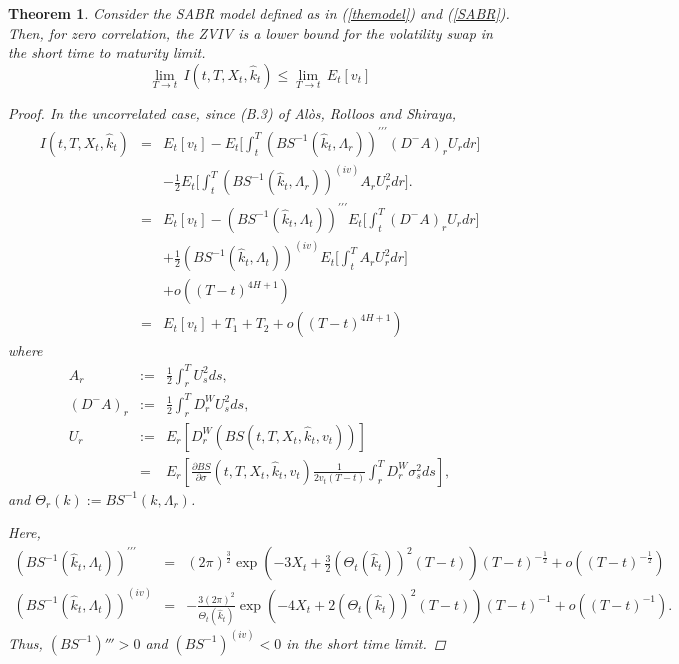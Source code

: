 \documentclass[11pt]{article}
\newtheorem{theorem}{Theorem}
\begin{document}
\begin{theorem}Consider the SABR model defined as in (\ref{themodel}) and (\ref{SABR}). Then, for zero correlation, the ZVIV is a lower bound for the volatility swap in the short time to maturity limit.
\begin{equation}
\lim_{T \to t} \, I( t,T,X_t,\hat{k}_t) \leq \lim_{T \to t} \,  E_{t}[v_{t}]
\end{equation}
\begin{proof}
In the uncorrelated case, since (B.3) of Al\`os, Rolloos and Shiraya,
\begin{eqnarray}
\label{primerpas}
I\left( t,T,X_t,\hat{k}_t\right) &=& E_{t}\left[ v_{t}\right] -  E_t\Bigg[\int_{t}^{T}\left( BS^{-1}\left( \hat{k}_t, \Lambda_r\right)\right) ^{\prime \prime\prime} (D^-A)_r U_r dr\Bigg]\nonumber\\
&&- \frac12 E_t\Bigg[
\int_{t}^{T}\left( BS^{-1}\left( \hat{k}_t, \Lambda_r\right)\right) ^{(iv)} A_r U_r^2 dr \Bigg].
\label{I-E[v]}\nonumber\\
&=& 
E_{t}\left[ v_{t}\right] -\left( BS^{-1}\left( \hat{k}_t, \Lambda_t\right)\right) ^{\prime \prime\prime} E_t\Bigg[\int_{t}^{T}(D^-A)_r U_r dr\Bigg]\nonumber\\
&&+ \frac12 \left( BS^{-1}\left( \hat{k}_t, \Lambda_t\right)\right) ^{(iv)} E_t\Bigg[
\int_{t}^{T} A_r U_r^2 dr \Bigg]\nonumber\\
&&+o((T-t)^{4H+1})\nonumber\\
&=& E_{t}\left[ v_{t}\right] + T_1 + T_2 +o((T-t)^{4H+1})
\end{eqnarray}
where 
\begin{eqnarray}
A_r&:=&\frac12 \int_{r}^{T} U_{s}^{2}ds,\\
(D^-A)_r&:=&\frac{1}{2}\int^T_r D_r^W U^2_s ds,\\
U_{r}&:=&E_{r}\left[D_r^W\left(BS(t,T,X_t,\hat{k}_t,v_t)\right)\right]\nonumber\\
&=&E_r\left[\frac{\partial BS}{\partial \sigma}(t,T,X_t,\hat{k}_t,v_t)\frac{1}{2v_t(T-t)}\int_r^T D_r^W\sigma_s^2 ds\right],
\end{eqnarray}
and $\Theta_{r}(k):=BS^{-1}(k,\Lambda_r)$.

Here,
\begin{eqnarray}
\label{terceraderivada}
\left( BS^{-1}\left( \hat{k}_t, \Lambda_t\right)\right) ^{\prime \prime\prime}
&=&(2\pi)^{\frac32}\exp\left(-3X_t+\frac{3}{2}(\Theta_t(\hat{k}_t))^2(T-t)\right)(T-t)^{-\frac12}+o\left((T-t)^{-\frac{1}{2}}\right)\\
\label{derivada4}
\left( BS^{-1}\left( \hat{k}_t, \Lambda_t\right)\right) ^{(iv)}&=&-\frac{3(2\pi)^{2}}{\Theta_t(\hat{k}_t)}\exp\left(-4X_t+2(\Theta_t(\hat{k}_t))^2(T-t)\right)(T-t)^{-1} + o\left((T-t)^{-1}\right).
\end{eqnarray}
Thus, $(BS^{-1})'''>0$ and $(BS^{-1})^{(iv)}<0$ in the short time limit.


\end{proof}
\end{theorem}
\end{document}

